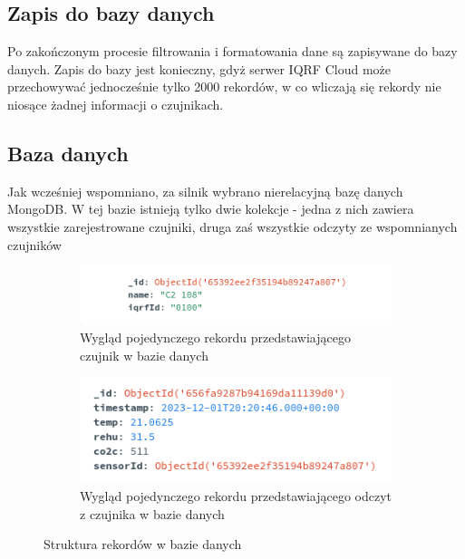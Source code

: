 \subsection{Zapis do bazy danych}

Po zakończonym procesie filtrowania i formatowania dane są zapisywane do bazy danych. Zapis do bazy jest konieczny, gdyż serwer IQRF Cloud może przechowywać
jednocześnie tylko 2000 rekordów, w co wliczają się rekordy nie niosące żadnej informacji o czujnikach.

\subsection{Baza danych}

Jak wcześniej wspomniano, za silnik wybrano nierelacyjną bazę danych MongoDB. W tej bazie istnieją tylko dwie kolekcje - jedna z nich zawiera wszystkie zarejestrowane 
czujniki, druga zaś wszystkie odczyty ze wspomnianych czujników 

\begin{figure}[H]
\begin{subfigure}{0.5\textwidth}
    \centering
    \includegraphics[width=\linewidth]{zdj/app/db-sensor.png}
    \caption{Wygląd pojedynczego rekordu przedstawiającego czujnik w bazie danych}
\end{subfigure}
\begin{subfigure}{0.5\textwidth}
    \centering
    \includegraphics[width=0.8\linewidth]{zdj/app/db-reading.png}
    \caption{Wygląd pojedynczego rekordu przedstawiającego odczyt z czujnika w bazie danych}
\end{subfigure}
   
\caption{Struktura rekordów w bazie danych}
\end{figure}

